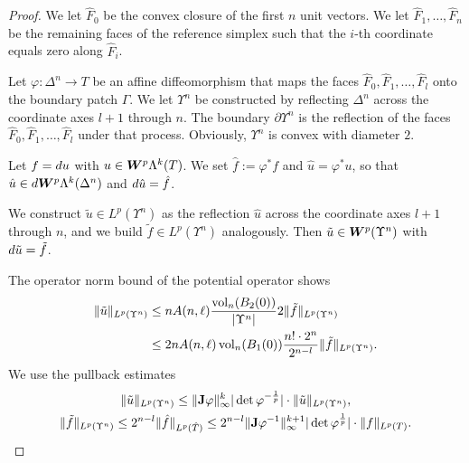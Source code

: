 \documentclass[10pt,a4paper]{article}
\begin{document}
\begin{proof}
    We let $\hat F_0$ be the convex closure of the first $n$ unit vectors. 
    We let $\hat F_1, \dots, \hat F_n$ be the remaining faces of the reference simplex 
    such that the $i$-th coordinate equals zero along $\hat F_i$.

    Let $\varphi : \Delta^{n} \rightarrow T$ be an affine diffeomorphism 
    that maps the faces $\hat F_{0}, \hat F_{1}, \dots, \hat F_{l}$ onto the boundary patch $\Gamma$. 
    We let $\Upsilon^{n}$ be constructed by reflecting $\Delta^{n}$ across the coordinate axes $l+1$ through $n$.
    The boundary $\partial\Upsilon^{n}$ is the reflection of the faces $\hat F_{0}, \hat F_{1}, \dots, \hat F_{l}$ under that process. 
    Obviously, $\Upsilon^{n}$ is convex with diameter $2$. 


    Let $f = d u$ with $u \in \bm{W}^{p}\Lambda^{k}(T)$.
    We set $\hat f := \varphi^{\ast} f$ and $\hat u = \varphi^{\ast} u$, 
    so that $\hat u \in d \bm{W}^{p}\Lambda^{k}(\Delta^{n})$ and $d \hat u = \hat f$.

    We construct $\tilde u \in L^{p}(\Upsilon^{n})$ as the reflection $\hat u$ across the coordinate axes $l+1$ through $n$, and we build $\tilde f \in L^{p}(\Upsilon^{n})$ analogously.
    Then $\tilde u \in \bm{W}^{p}(\Upsilon^{n})$ with $d \tilde u = \tilde f$. 

    The operator norm bound of the potential operator shows 
    \begin{align*}
        \| \tilde u \|_{L^{p}(\Upsilon^{n})} 
        &\leq 
        n A(n,\ell) \frac{ \operatorname{vol}_{n}(B_2(0)) }{|\Upsilon^{n}|} 2 
        \| \tilde f \|_{L^{p}(\Upsilon^{n})}
        \\&
        \leq 
        2 n A(n,\ell) \operatorname{vol}_{n}(B_1(0)) \frac{ n! \cdot 2^{n} }{2^{n-l}} 
        \| \tilde f \|_{L^{p}(\Upsilon^{n})}
        .
    \end{align*}
    We use the pullback estimates 
    \begin{gather*}
        \| \tilde u \|_{L^{p}(\Upsilon^{n})} 
        \leq 
        \| {\mathbf{J}}\varphi \|_{\infty}^{k}
        |\det\varphi^{-\frac{1}{p}}|
        \cdot 
        \| \tilde u \|_{L^{p}(\Upsilon^{n})} 
        ,
        \\
        \| \tilde f \|_{L^{p}(\Upsilon^{n})} 
        \leq 
        2^{n-l}
        \| \hat f \|_{L^{p}(\hat T)} 
        \leq 
        2^{n-l}
        \| {\mathbf{J}}\varphi^{-1} \|_{\infty}^{k+1}
        |\det\varphi^{\frac{1}{p}}|
        \cdot 
        \| f \|_{L^{p}(T)} 
        .
    \end{gather*}
\end{proof}
\end{document}
